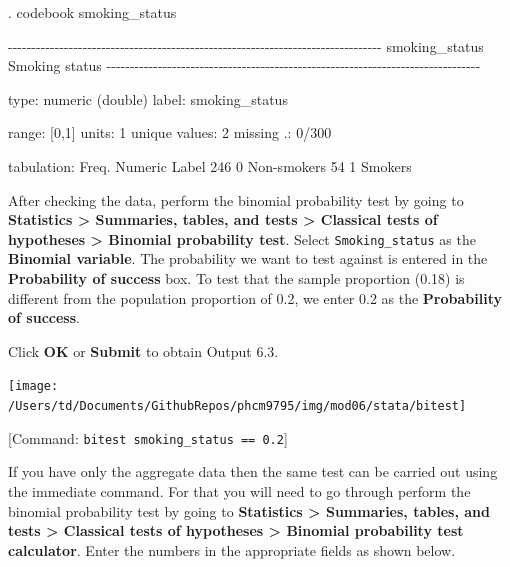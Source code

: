 \documentclass[
]{memoir}
\newenvironment{Shaded}{\begin{snugshade}}{\end{snugshade}}
\newcommand{\NormalTok}[1]{#1}
\begin{document}
\begin{Shaded}
\begin{Highlighting}[]
\NormalTok{. codebook smoking\_status }

\NormalTok{{-}{-}{-}{-}{-}{-}{-}{-}{-}{-}{-}{-}{-}{-}{-}{-}{-}{-}{-}{-}{-}{-}{-}{-}{-}{-}{-}{-}{-}{-}{-}{-}{-}{-}{-}{-}{-}{-}{-}{-}{-}{-}{-}{-}{-}{-}{-}{-}{-}{-}{-}{-}{-}{-}{-}{-}{-}{-}{-}{-}{-}{-}{-}{-}{-}{-}{-}{-}{-}{-}{-}{-}{-}{-}{-}{-}{-}{-}{-}{-}}
\NormalTok{smoking\_status                                                    Smoking status}
\NormalTok{{-}{-}{-}{-}{-}{-}{-}{-}{-}{-}{-}{-}{-}{-}{-}{-}{-}{-}{-}{-}{-}{-}{-}{-}{-}{-}{-}{-}{-}{-}{-}{-}{-}{-}{-}{-}{-}{-}{-}{-}{-}{-}{-}{-}{-}{-}{-}{-}{-}{-}{-}{-}{-}{-}{-}{-}{-}{-}{-}{-}{-}{-}{-}{-}{-}{-}{-}{-}{-}{-}{-}{-}{-}{-}{-}{-}{-}{-}{-}{-}}

\NormalTok{                  type:  numeric (double)}
\NormalTok{                 label:  smoking\_status}

\NormalTok{                 range:  [0,1]                        units:  1}
\NormalTok{         unique values:  2                        missing .:  0/300}

\NormalTok{            tabulation:  Freq.   Numeric  Label}
\NormalTok{                           246         0  Non{-}smokers}
\NormalTok{                            54         1  Smokers}
\end{Highlighting}
\end{Shaded}

After checking the data, perform the binomial probability test by going to \textbf{Statistics \textgreater{} Summaries, tables, and tests \textgreater{} Classical tests of hypotheses \textgreater{} Binomial probability test}. Select \texttt{Smoking\_status} as the \textbf{Binomial variable}. The probability we want to test against is entered in the \textbf{Probability of success} box. To test that the sample proportion (0.18) is different from the population proportion of 0.2, we enter 0.2 as the \textbf{Probability of success}.

Click \textbf{OK} or \textbf{Submit} to obtain Output 6.3.

\texttt{[image: /Users/td/Documents/GithubRepos/phcm9795/img/mod06/stata/bitest]}

{[}Command: \texttt{bitest\ smoking\_status\ ==\ 0.2}{]}

If you have only the aggregate data then the same test can be carried out using the immediate command. For that you will need to go through perform the binomial
probability test by going to \textbf{Statistics \textgreater{} Summaries, tables, and tests \textgreater{} Classical tests of hypotheses \textgreater{} Binomial probability test calculator}. Enter the numbers in the appropriate fields as shown below.
\end{document}
